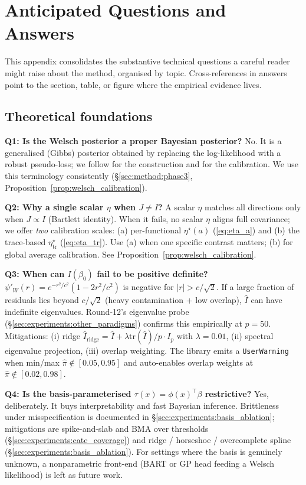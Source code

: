 \section{Anticipated Questions and Answers}
\label{app:qa}

This appendix consolidates the substantive technical questions a
careful reader might raise about the method, organised by topic.
Cross-references in answers point to the section, table, or figure
where the empirical evidence lives.

\subsection{Theoretical foundations}

\textbf{Q1: Is the Welsch posterior a proper Bayesian posterior?}
No. It is a generalised (Gibbs) posterior obtained by replacing the
log-likelihood with a robust pseudo-loss; we follow
\citet{bissiri2016general} for the construction and
\citet{lyddon2019general} for the calibration. We use this terminology
consistently (\S\ref{sec:method:phase3}, Proposition~\ref{prop:welsch_calibration}).

\textbf{Q2: Why a single scalar $\eta$ when $J \neq I$?}
A scalar $\eta$ matches all directions only when $J \propto I$
(Bartlett identity). When it fails, no scalar $\eta$ aligns full
covariance; we offer \emph{two} calibration scales:
(a) per-functional $\eta^\star(a)$ (\eqref{eq:eta_a}) and (b) the
trace-based $\eta^\star_\mathrm{tr}$ (\eqref{eq:eta_tr}). Use (a)
when one specific contrast matters; (b) for global average
calibration. See Proposition~\ref{prop:welsch_calibration}.

\textbf{Q3: When can $I(\beta_0)$ fail to be positive definite?}
$\psi'_W(r) = e^{-r^2/c^2}(1 - 2r^2/c^2)$ is negative for $|r| > c/\sqrt{2}$.
If a large fraction of residuals lies beyond $c/\sqrt{2}$ (heavy
contamination + low overlap), $\widehat I$ can have indefinite
eigenvalues. Round-12's eigenvalue probe (\S\ref{sec:experiments:other_paradigms})
confirms this empirically at $p = 50$. Mitigations: (i) ridge
$\widehat I_{\text{ridge}} = \widehat I + \lambda \mathrm{tr}(\widehat I)/p \cdot I_p$
with $\lambda = 0.01$, (ii) spectral eigenvalue projection,
(iii) overlap weighting. The library emits a \texttt{UserWarning}
when min/max $\hat\pi \notin [0.05, 0.95]$ and auto-enables overlap
weights at $\hat\pi \notin [0.02, 0.98]$.

\textbf{Q4: Is the basis-parameterised $\tau(x) = \phi(x)^\top\beta$
restrictive?}
Yes, deliberately. It buys interpretability and fast Bayesian
inference. Brittleness under misspecification is documented in
\S\ref{sec:experiments:basis_ablation}; mitigations are spike-and-slab
and BMA over thresholds (\S\ref{sec:experiments:cate_coverage})
and ridge / horseshoe / overcomplete spline (\S\ref{sec:experiments:basis_ablation}).
For settings where the basis is genuinely unknown, a nonparametric
front-end (BART or GP head feeding a Welsch likelihood) is left as
future work.

